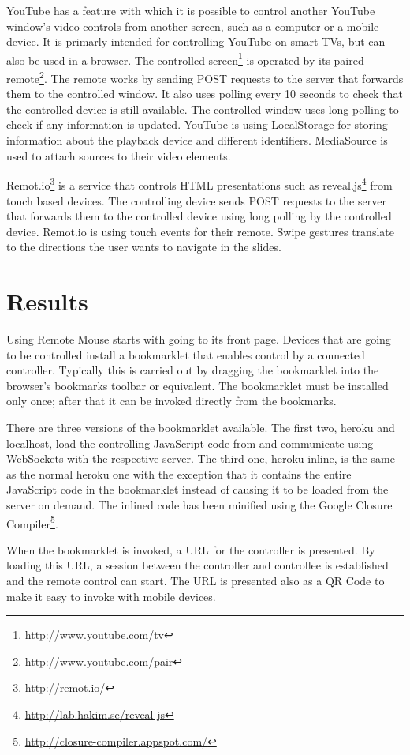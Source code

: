 \documentclass[a4paper,english,twocolumn]{article}
\begin{document}
YouTube has a feature with which it is possible to control another
YouTube window's video controls from another screen, such as a
computer or a mobile device. It is primarly intended for controlling
YouTube on smart TVs, but can also be used in a browser. The
controlled screen\footnote{\url{http://www.youtube.com/tv}} is
operated by its paired
remote\footnote{\url{http://www.youtube.com/pair}}. The remote works
by sending POST requests to the server that forwards them to the
controlled window. It also uses polling every 10 seconds to check that
the controlled device is still available. The controlled window uses
long polling to check if any information is updated. YouTube is using
LocalStorage for storing information about the playback device and
different identifiers. MediaSource is used to attach sources to their
video elements.

Remot.io\footnote{\url{http://remot.io/}} is a service that controls
HTML presentations such as
reveal.js\footnote{\url{http://lab.hakim.se/reveal-js}} from touch
based devices. The controlling device sends POST requests to the
server that forwards them to the controlled device using long polling
by the controlled device. Remot.io is using touch events for their
remote. Swipe gestures translate to the directions the user wants to
navigate in the slides.

\section{Results}

Using Remote Mouse starts with going to its front page. Devices that
are going to be controlled install a bookmarklet that enables control
by a connected controller. Typically this is carried out by dragging
the bookmarklet into the browser's bookmarks toolbar or
equivalent. The bookmarklet must be installed only once; after that it
can be invoked directly from the bookmarks.

There are three versions of the bookmarklet available. The first two,
heroku and localhost, load the controlling JavaScript code from and
communicate using WebSockets with the respective server. The third
one, heroku inline, is the same as the normal heroku one with the
exception that it contains the entire JavaScript code in the
bookmarklet instead of causing it to be loaded from the server on
demand. The inlined code has been minified using the Google Closure
Compiler\footnote{\url{http://closure-compiler.appspot.com/}}.

When the bookmarklet is invoked, a URL for the controller is
presented. By loading this URL, a session between the controller and
controllee is established and the remote control can start. The URL is
presented also as a QR Code to make it easy to invoke with mobile
devices.
\end{document}
